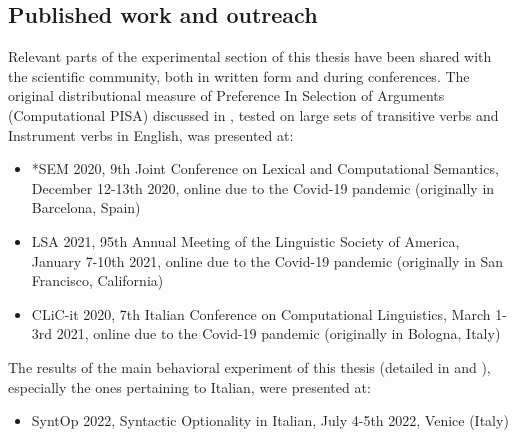 \subsection{Published work and outreach}
Relevant parts of the experimental section of this thesis have been shared with the scientific community, both in written form and during conferences. The original distributional measure of Preference In Selection of Arguments (Computational PISA) discussed in \textcite{CappelliLenciPISA}, tested on large sets of transitive verbs and Instrument verbs in English, was presented at:
\begin{itemize}
    \item *SEM 2020, 9th Joint Conference on Lexical and Computational Semantics, December 12-13th 2020, online due to the Covid-19 pandemic (originally in Barcelona, Spain)
    \item LSA 2021, 95th Annual Meeting of the Linguistic Society of America, January 7-10th 2021, online due to the Covid-19 pandemic (originally in San Francisco, California)
    \item CLiC-it 2020, 7th Italian Conference on Computational Linguistics, March 1-3rd 2021, online due to the Covid-19 pandemic (originally in Bologna, Italy)
\end{itemize}
The results of the main behavioral experiment of this thesis (detailed in  and ), especially the ones pertaining to Italian, were presented at:
\begin{itemize}
    \item SyntOp 2022, Syntactic Optionality in Italian, July 4-5th 2022, Venice (Italy)
\end{itemize}